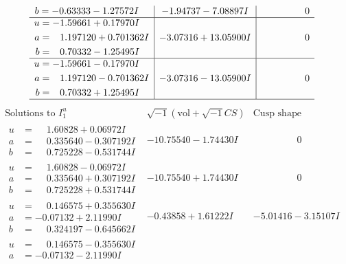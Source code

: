 \documentclass[1p]{elsarticle_modified}
\theoremstyle{definition}
\newcommand{\I}{\sqrt{-1}}
\begin{document}
$$\begin{array}{c|c|c}
\begin{aligned}
b &= -0.63333 - 1.27572 I\end{aligned}
 & -1.94737 - 7.08897 I & \phantom{-0.000000 } 0 \\ \hline\begin{aligned}
u &= -1.59661 + 0.17970 I \\
a &= \phantom{-}1.197120 + 0.701362 I \\
b &= \phantom{-}0.70332 - 1.25495 I\end{aligned}
 & -3.07316 + 13.05900 I & \phantom{-0.000000 } 0 \\ \hline\begin{aligned}
u &= -1.59661 - 0.17970 I \\
a &= \phantom{-}1.197120 - 0.701362 I \\
b &= \phantom{-}0.70332 + 1.25495 I\end{aligned}
 & -3.07316 - 13.05900 I & \phantom{-0.000000 } 0\\
 \hline 
 \end{array}$$\newpage$$\begin{array}{c|c|c}  
\text{Solutions to }I^u_{1}& \I (\text{vol} + \sqrt{-1}CS) & \text{Cusp shape}\\
 \hline 
\begin{aligned}
u &= \phantom{-}1.60828 + 0.06972 I \\
a &= \phantom{-}0.335640 - 0.307192 I \\
b &= \phantom{-}0.725228 - 0.531744 I\end{aligned}
 & -10.75540 - 1.74430 I & \phantom{-0.000000 } 0 \\ \hline\begin{aligned}
u &= \phantom{-}1.60828 - 0.06972 I \\
a &= \phantom{-}0.335640 + 0.307192 I \\
b &= \phantom{-}0.725228 + 0.531744 I\end{aligned}
 & -10.75540 + 1.74430 I & \phantom{-0.000000 } 0 \\ \hline\begin{aligned}
u &= \phantom{-}0.146575 + 0.355630 I \\
a &= -0.07132 + 2.11990 I \\
b &= \phantom{-}0.324197 - 0.645662 I\end{aligned}
 & -0.43858 + 1.61222 I & -5.01416 - 3.15107 I \\ \hline\begin{aligned}
u &= \phantom{-}0.146575 - 0.355630 I \\
a &= -0.07132 - 2.11990 I \\

\end{aligned}
\end{array}$$
\end{document}
